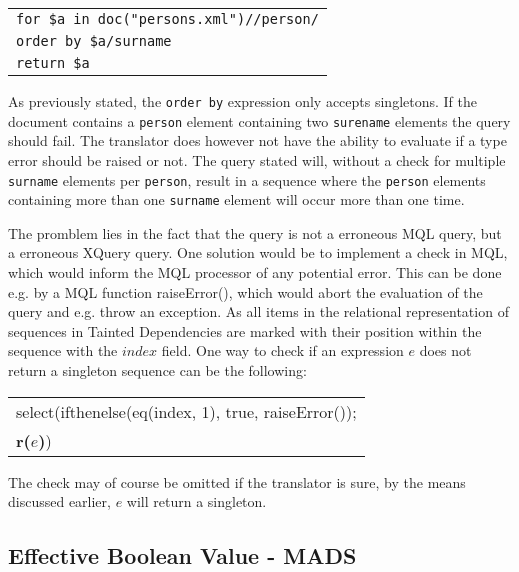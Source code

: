 \begin{center}
\begin{tabular}{l}
\texttt{for \$a in doc("persons.xml")//person/} \\
\texttt{order by \$a/surname} \\
\texttt{return \$a}
\end{tabular}
\end{center}

As previously stated, the \texttt{order by} expression only accepts singletons. If the document contains a
\texttt{person} element containing two \texttt{surename} elements the query should fail. The translator does
however not have the ability to evaluate if a type error should be raised or not. The query stated will, without a
check for multiple \texttt{surname} elements per \texttt{person}, result in a sequence where the \texttt{person}
elements containing more than one \texttt{surname} element will occur more than one time. 

The promblem lies in the fact that the query is not a erroneous MQL query, but a erroneous XQuery query. One
solution would be to implement a check in MQL, which would inform the MQL processor of any potential error. This
can be done e.g. by a MQL function \textsf{raiseError()}, which would abort the evaluation of the query and e.g.
throw an exception. As all items in the relational representation of sequences in Tainted Dependencies are marked
with their position within the sequence with the $index$ field. One way to check if an expression $e$ does not
return a singleton sequence can be the following:
\begin{center}
\begin{tabular}{l}
\textsf{select(ifthenelse(eq(index, 1), true, raiseError());} \\ \quad
\textbf{r(}$e$\textbf{)}\textsf{)}
\end{tabular}
\end{center}

The check may of course be omitted if the translator is sure, by the means discussed earlier, $e$ will return a
singleton.

\subsection{Effective Boolean Value - {MADS}}
\label{sect:disc:effBool}

